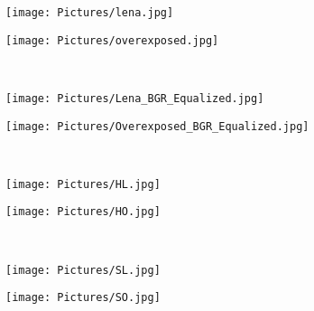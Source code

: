\documentclass[11pt,a4paper]{article}
\begin{document}
\begin{figure}[htbp]
\centering
\begin{minipage}{0.7\textwidth}
\begin{minipage}{0.4\textwidth}
  \centering
\texttt{[image: Pictures/lena.jpg]}
\end{minipage}%
\begin{minipage}{0.6\textwidth}
  \centering
\texttt{[image: Pictures/overexposed.jpg]}
\end{minipage}
\end{minipage}\\

\begin{minipage}{0.7\textwidth}
\begin{minipage}{0.4\textwidth}
  \centering
\texttt{[image: Pictures/Lena\_BGR\_Equalized.jpg]}
\end{minipage}%
\begin{minipage}{0.6\textwidth}
  \centering
\texttt{[image: Pictures/Overexposed\_BGR\_Equalized.jpg]}
\end{minipage}
\label{fig:BGREqual}
\end{minipage}\\

\begin{minipage}{0.7\textwidth}
\begin{minipage}{0.4\textwidth}
  \centering
\texttt{[image: Pictures/HL.jpg]}
\end{minipage}%
\begin{minipage}{0.6\textwidth}
  \centering
\texttt{[image: Pictures/HO.jpg]}
\end{minipage}
\end{minipage}\\

\begin{minipage}{0.7\textwidth}
\begin{minipage}{0.4\textwidth}
  \centering
\texttt{[image: Pictures/SL.jpg]}
\end{minipage}%
\begin{minipage}{0.6\textwidth}
  \centering
\texttt{[image: Pictures/SO.jpg]}
\end{minipage}
\end{minipage}\\


\end{figure}
\end{document}
